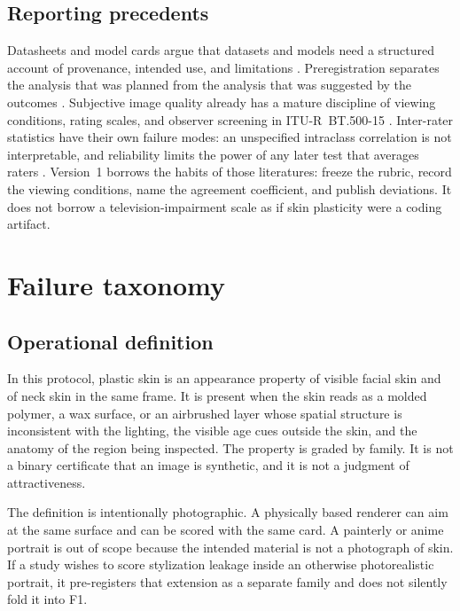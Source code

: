 \documentclass[10pt,twocolumn]{article}
\begin{document}
\subsection{Reporting precedents}

Datasheets and model cards argue that datasets and models need a structured account of provenance, intended use, and limitations \cite{gebru2021,mitchell2019}. Preregistration separates the analysis that was planned from the analysis that was suggested by the outcomes \cite{nosek2018}. Subjective image quality already has a mature discipline of viewing conditions, rating scales, and observer screening in ITU-R~BT.500-15 \cite{itu500}. Inter-rater statistics have their own failure modes: an unspecified intraclass correlation is not interpretable, and reliability limits the power of any later test that averages raters \cite{shrout1979,koo2016,hallgren2012,hayes2007}. Version~1 borrows the habits of those literatures: freeze the rubric, record the viewing conditions, name the agreement coefficient, and publish deviations. It does not borrow a television-impairment scale as if skin plasticity were a coding artifact.

\section{Failure taxonomy}
\label{sec:taxonomy}

\subsection{Operational definition}

In this protocol, plastic skin is an appearance property of visible facial skin and of neck skin in the same frame. It is present when the skin reads as a molded polymer, a wax surface, or an airbrushed layer whose spatial structure is inconsistent with the lighting, the visible age cues outside the skin, and the anatomy of the region being inspected. The property is graded by family. It is not a binary certificate that an image is synthetic, and it is not a judgment of attractiveness.

The definition is intentionally photographic. A physically based renderer can aim at the same surface and can be scored with the same card. A painterly or anime portrait is out of scope because the intended material is not a photograph of skin. If a study wishes to score stylization leakage inside an otherwise photorealistic portrait, it pre-registers that extension as a separate family and does not silently fold it into F1.
\end{document}
